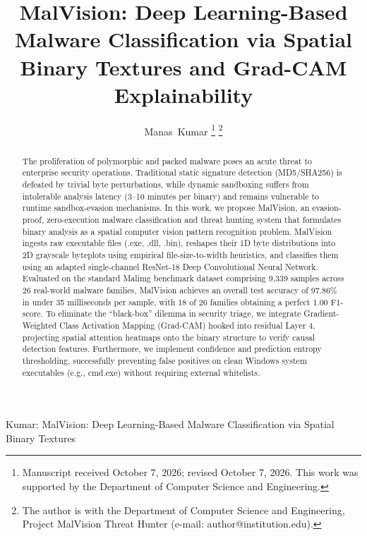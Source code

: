 \documentclass[journal,10pt,twocolumn]{IEEEtran}
\begin{document}
\title{MalVision: Deep Learning-Based Malware Classification via Spatial Binary Textures and Grad-CAM Explainability}

\author{Manas~Kumar
\thanks{Manuscript received October 7, 2026; revised October 7, 2026. This work was supported by the Department of Computer Science and Engineering.}%
\thanks{The author is with the Department of Computer Science and Engineering, Project MalVision Threat Hunter (e-mail: author@institution.edu).}%
}

%
{Kumar: MalVision: Deep Learning-Based Malware Classification via Spatial Binary Textures}

\maketitle

\begin{abstract}
The proliferation of polymorphic and packed malware poses an acute threat to enterprise security operations. Traditional static signature detection (MD5/SHA256) is defeated by trivial byte perturbations, while dynamic sandboxing suffers from intolerable analysis latency (3--10 minutes per binary) and remains vulnerable to runtime sandbox-evasion mechanisms. In this work, we propose MalVision, an evasion-proof, zero-execution malware classification and threat hunting system that formulates binary analysis as a spatial computer vision pattern recognition problem. MalVision ingests raw executable files (.exe, .dll, .bin), reshapes their 1D byte distributions into 2D grayscale byteplots using empirical file-size-to-width heuristics, and classifies them using an adapted single-channel ResNet-18 Deep Convolutional Neural Network. Evaluated on the standard Malimg benchmark dataset comprising 9,339 samples across 26 real-world malware families, MalVision achieves an overall test accuracy of 97.86\% in under 35 milliseconds per sample, with 18 of 26 families obtaining a perfect 1.00 F1-score. To eliminate the ``black-box'' dilemma in security triage, we integrate Gradient-Weighted Class Activation Mapping (Grad-CAM) hooked into residual Layer 4, projecting spatial attention heatmaps onto the binary structure to verify causal detection features. Furthermore, we implement confidence and prediction entropy thresholding, successfully preventing false positives on clean Windows system executables (e.g., cmd.exe) without requiring external whitelists.
\end{abstract}
\end{document}

